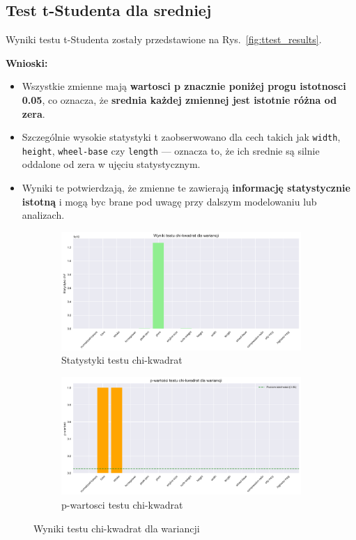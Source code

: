 \documentclass[12pt,a4paper]{article}
\begin{document}
\subsection{Test t-Studenta dla sredniej}

Wyniki testu t-Studenta zostały przedstawione na Rys.~\ref{fig:ttest_results}.

\textbf{Wnioski:}

\begin{itemize}
    \item Wszystkie zmienne mają \textbf{wartosci p znacznie poniżej progu istotnosci 0.05}, co oznacza, że \textbf{srednia każdej zmiennej jest istotnie różna od zera}.
    \item Szczególnie wysokie statystyki t zaobserwowano dla cech takich jak \texttt{width}, \texttt{height}, \texttt{wheel-base} czy \texttt{length} — oznacza to, że ich srednie są silnie oddalone od zera w ujęciu statystycznym.
    \item Wyniki te potwierdzają, że zmienne te zawierają \textbf{informację statystycznie istotną} i mogą byc brane pod uwagę przy dalszym modelowaniu lub analizach.
\end{itemize}

\begin{figure}[H]
    \centering
    \begin{subfigure}[b]{0.48\textwidth}
        \includegraphics[width=\textwidth]{figures/chi2_statistics.png}
        \caption{Statystyki testu chi-kwadrat}
    \end{subfigure}
    \hfill
    \begin{subfigure}[b]{0.48\textwidth}
        \includegraphics[width=\textwidth]{figures/chi2_pvalues.png}
        \caption{p-wartosci testu chi-kwadrat}
    \end{subfigure}
    \caption{Wyniki testu chi-kwadrat dla wariancji}
    \label{fig:chi2_results}
\end{figure}
\end{document}

